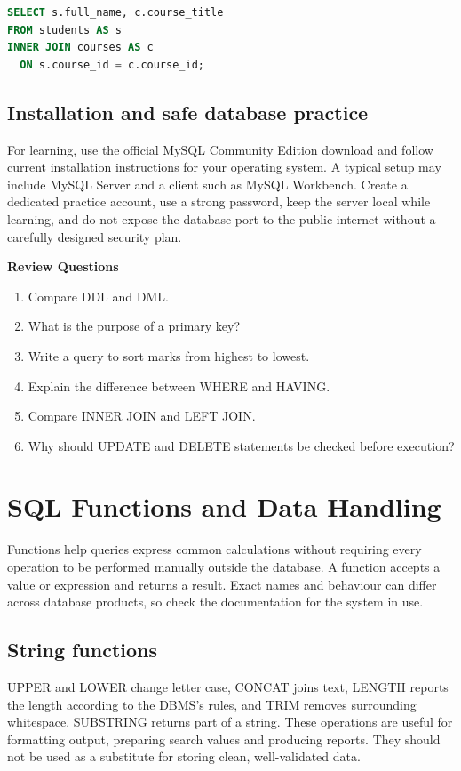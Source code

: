 \documentclass[11pt,openany,oneside]{book}
\begin{document}
\begin{lstlisting}[style=webcode,language=SQL]
SELECT s.full_name, c.course_title
FROM students AS s
INNER JOIN courses AS c
  ON s.course_id = c.course_id;
\end{lstlisting}

\section{Installation and safe database practice}
For learning, use the official MySQL Community Edition download and follow current installation instructions for your operating system. A typical setup may include MySQL Server and a client such as MySQL Workbench. Create a dedicated practice account, use a strong password, keep the server local while learning, and do not expose the database port to the public internet without a carefully designed security plan.

\par\noindent\textbf{Review Questions}\begin{enumerate}[label=\arabic*.,leftmargin=1.8em,itemsep=2pt,topsep=2pt]
\item Compare DDL and DML.
\item What is the purpose of a primary key?
\item Write a query to sort marks from highest to lowest.
\item Explain the difference between WHERE and HAVING.
\item Compare INNER JOIN and LEFT JOIN.
\item Why should UPDATE and DELETE statements be checked before execution?
\end{enumerate}

\chapter{SQL Functions and Data Handling}
Functions help queries express common calculations without requiring every operation to be performed manually outside the database. A function accepts a value or expression and returns a result. Exact names and behaviour can differ across database products, so check the documentation for the system in use.

\section{String functions}
UPPER and LOWER change letter case, CONCAT joins text, LENGTH reports the length according to the DBMS's rules, and TRIM removes surrounding whitespace. SUBSTRING returns part of a string. These operations are useful for formatting output, preparing search values and producing reports. They should not be used as a substitute for storing clean, well-validated data.
\end{document}

